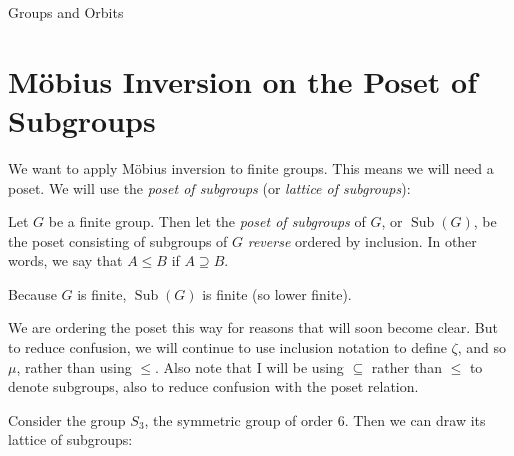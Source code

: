 \documentclass[12pt]{pom_thesis}
\DeclareMathOperator{\sub}{Sub}
\begin{document}
\begin{chapter}{Groups and Orbits}
\section{M\"obius Inversion on the Poset of Subgroups}
We want to apply M\"obius inversion to finite groups. This means we will need a poset. We will use the \emph{poset of subgroups} (or \emph{lattice of subgroups}):
\begin{defn}
Let $G$ be a finite group. Then let the \textit{poset of subgroups} of $G$, or $\sub(G)$, be the poset consisting of subgroups of $G$ \emph{reverse} ordered by inclusion. In other words, we say that $A \leq B$ if $A \supseteq B$.
\end{defn}
\begin{rmk}
Because $G$ is finite, $\sub(G)$ is finite (so lower finite).
\end{rmk}
\begin{rmk}
We are ordering the poset this way for reasons that will soon become clear. But to reduce confusion, we will continue to use inclusion notation to define $\zeta$, and so $\mu$, rather than using $\leq$. Also note that I will be using $\subseteq$ rather than $\leq$ to denote subgroups, also to reduce confusion with the poset relation.
\end{rmk}
\begin{examp}
Consider the group $S_3$, the symmetric group of order 6. Then we can draw its lattice of subgroups:


\end{examp}
\end{chapter}
\end{document}
